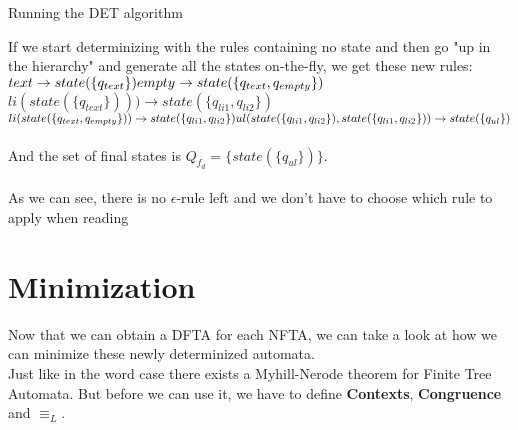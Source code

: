 \documentclass{llncs}
\begin{document}
\begin{example}{Running the DET algorithm}
\begin{center}
			\end{center}
					If we start determinizing with the rules containing no state and then go "up in the hierarchy" and generate all the states on-the-fly, we get these new rules:
					\\
					\(
					\\
					text \rightarrow state(\{q_{text}\})
					\\
					empty \rightarrow state(\{q_{text}, q_{empty}\})\)
					\\
					\(li(state(\{q_{text}\}))) \rightarrow state(\{q_{li1}, q_{li2}\})\)
					\newline
					\(li(state(\{q_{text}, q_{empty}\})) \rightarrow state(\{q_{li1}, q_{li2}\})
					\\
					ul(state(\{q_{li1}, q_{li2}\}), state(\{q_{li1}, q_{li2}\})) \rightarrow state(\{q_{ul}\})
					\)
					\\
					\\
				    And the set of final states is \(Q_{f_d} = \{state(\{q_{ul}\})\}\).
				    \\
				    \\
				    As we can see, there is no \(\epsilon\)-rule left and we don't have to choose which rule to apply when reading 
			\end{example}

\pagebreak

\chapter*{Minimization}

Now that we can obtain a DFTA for each NFTA, we can take a look at how we can minimize these newly determinized automata.
\\
Just like in the word case there exists a Myhill-Nerode theorem for Finite Tree Automata. But before we can use it, we have to define \textbf{Contexts}, \textbf{Congruence} and \(\equiv_L\).
\end{document}
